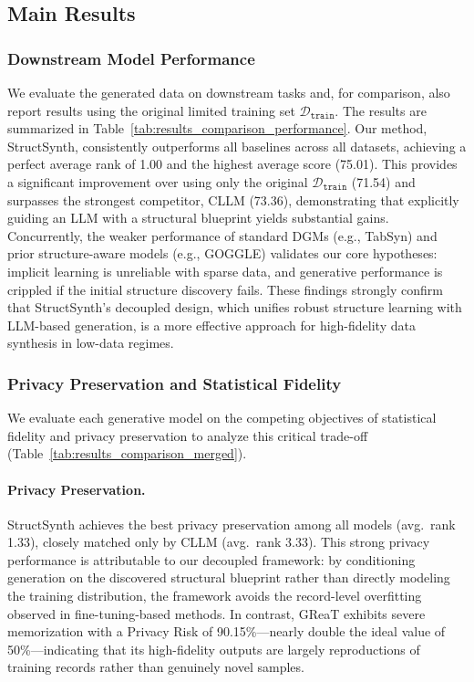 \subsection{Main Results}
\subsubsection{Downstream Model Performance}
We evaluate the generated data on downstream tasks and, for comparison, also report results using the original limited training set $\mathcal{D}_\mathtt{train}$. The results are summarized in Table~\ref{tab:results_comparison_performance}. Our method, \textsf{StructSynth}, consistently outperforms all baselines across all datasets, achieving a perfect average rank of 1.00 and the highest average score (75.01). This provides a significant improvement over using only the original $\mathcal{D}_\mathtt{train}$ (71.54) and surpasses the strongest competitor, CLLM (73.36), demonstrating that explicitly guiding an LLM with a structural blueprint yields substantial gains. Concurrently, the weaker performance of standard DGMs (e.g., TabSyn) and prior structure-aware models (e.g., GOGGLE) validates our core hypotheses: implicit learning is unreliable with sparse data, and generative performance is crippled if the initial structure discovery fails. These findings strongly confirm that \textsf{StructSynth}'s decoupled design, which unifies robust structure learning with LLM-based generation, is a more effective approach for high-fidelity data synthesis in low-data regimes.



\subsubsection{Privacy Preservation and Statistical Fidelity}

We evaluate each generative model on the competing objectives of statistical fidelity and privacy preservation to analyze this critical trade-off (Table~\ref{tab:results_comparison_merged}).

\paragraph{Privacy Preservation.}
\textsf{StructSynth} achieves the best privacy preservation among all models (avg.\ rank 1.33), closely matched only by CLLM (avg.\ rank 3.33). This strong privacy performance is attributable to our decoupled framework: by conditioning generation on the discovered structural blueprint rather than directly modeling the training distribution, the framework avoids the record-level overfitting observed in fine-tuning-based methods. In contrast, GReaT exhibits severe memorization with a Privacy Risk of 90.15\%---nearly double the ideal value of 50\%---indicating that its high-fidelity outputs are largely reproductions of training records rather than genuinely novel samples.

